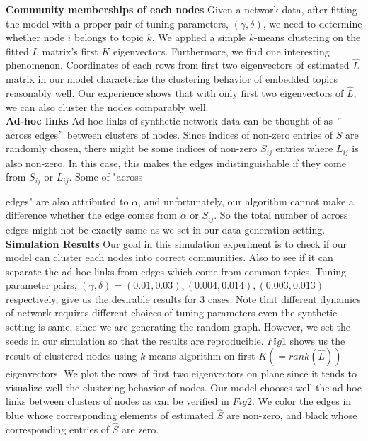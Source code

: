 \documentclass{article}
\begin{document}
\noindent \textbf{Community memberships of each nodes} Given a network data, after fitting the model with a proper pair of tuning parameters, $(\gamma,\delta)$, we need to determine whether node $i$ belongs to topic $k$. We applied a simple $k$-means clustering on the fitted $L$ matrix's first $K$ eigenvectors. Furthermore, we find one interesting phenomenon. Coordinates of each rows from first two eigenvectors of estimated $\hat{L}$ matrix in our model characterize the clustering behavior of embedded topics reasonably well. Our experience shows that with only first two eigenvectors of $\hat{L}$, we can also cluster the nodes comparably well. \\

\noindent \textbf{Ad-hoc links} Ad-hoc links of synthetic network data can be thought of as $"$across edges$"$ between clusters of nodes. Since indices of non-zero entries of $S$ are randomly chosen, there might be some indices of non-zero $S_{ij}$ entries where $L_{ij}$ is also non-zero. In this case, this makes the edges indistinguishable if they come from $S_{ij}$ or $L_{ij}$. Some of "across 

\noindent edges" are also attributed to $\alpha$, and unfortunately, our algorithm cannot make a difference whether the edge comes from $\alpha$ or $S_{ij}$. So the total number of across edges might not be exactly same as we set in our data generation setting. \\

\noindent \textbf{Simulation Results} Our goal in this simulation experiment is to check if our model can cluster each nodes into correct communities. Also to see if it can separate the ad-hoc links from edges which come from common topics. Tuning parameter pairs, $(\gamma,\delta) = (0.01,0.03),(0.004,0.014),(0.003,0.013)$ respectively, give us the desirable results for 3 cases. Note that different dynamics of network requires different choices of tuning parameters even the synthetic setting is same, since we are generating the random graph. However, we set the seeds in our simulation so that the results are reproducible. $Fig1$ shows us the result of clustered nodes using $k$-means algorithm on first $K(=rank(\hat{L}))$ eigenvectors. We plot the rows of first two eigenvectors on plane since it tends to visualize well the clustering behavior of nodes. Our model chooses well the ad-hoc links between clusters of nodes as can be verified in $Fig2$. We color the edges in blue whose corresponding elements of estimated $\hat{S}$ are non-zero, and black whose corresponding entries of $\hat{S}$ are zero. 
\end{document}
